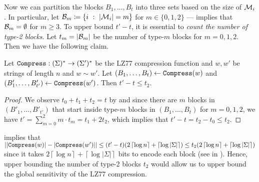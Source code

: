 



Now we can partition the blocks $B_1,\ldots,B_t$ into three sets based on the size of $\mathcal{M}_i$. In particular, let ${\mathcal{B}}_m \coloneqq \{ i ~:~|\mathcal{M}_i| = m\}$ for $m \in \{0,1,2\}$ ---  implies that ${\mathcal{B}}_m = \emptyset$ for $m \geq 3$. To upper bound $t'-t$, it is essential to \emph{count the number of type-2 blocks}. Let $t_m = \left| {\mathcal{B}}_m  \right|$ be the number of type-$m$ blocks for $m=0,1,2$. Then we have the following claim.

\begin{claim}
Let $\mathtt{Compress}:(\Sigma)^*\rightarrow(\Sigma')^*$ be the LZ77 compression function and $w,w'$ be strings of length $n$ and $w\sim w'$. Let $(B_1,\ldots,B_t)\gets\mathtt{Compress}(w)$ and $(B_1',\ldots,B_{t'}')\gets\mathtt{Compress}(w')$. Then $t'-t \leq t_2$.
\end{claim}
\begin{proof}
We observe $t_0+t_1+t_2=t$ by  and since there are $m$ blocks in $(B'_1,\ldots,B'_{t'})$ that start inside type-$m$ blocks in $(B_1,\ldots,B_t)$ for $m=0,1,2$, we have $t'=\sum_{m=0}^2 m\cdot t_m = t_1 + 2t_2$, which implies that $t'-t = t_2 - t_0 \leq t_2$.
\end{proof}

 implies that $\left| \left| \mathtt{Compress}(w) \right| - \left| \mathtt{Compress}(w') \right| \right| \leq (t'-t)(2\left\lceil \log n \right \rceil + \left\lceil \log |\Sigma|\right \rceil)\leq  t_2(2\left\lceil \log n \right \rceil + \left\lceil \log |\Sigma|\right \rceil)$ since it takes $2\left\lceil \log n \right \rceil + \left\lceil \log |\Sigma|\right \rceil$ bits to encode each block (see  in ). Hence, upper bounding the number of type-2 blocks $t_2$ would allow us to upper bound the global sensitivity of the LZ77 compression.


